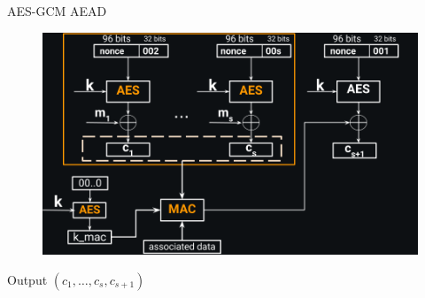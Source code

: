\documentclass[usenames,dvipsnames, 9pt]{beamer}
\begin{document}
\begin{frame}{AES-GCM AEAD}
{\begin{figure}
	\end{figure}
}
{
	\begin{figure}
		\includegraphics[width=\linewidth]{AES_GCM_AEAD_full}
	\end{figure}
}
{
Output $(c_1, \ldots, c_s, c_{s+1})$
}
\end{frame}
\end{document}
